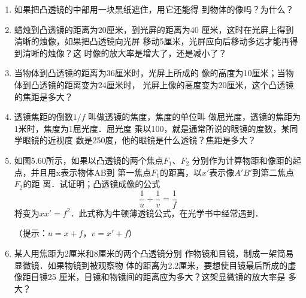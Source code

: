 \begin{enumerate}
\begin{figure}[htp]
	\caption{}
\end{figure}
\item 如果把凸透镜的中部用一块黑纸遮住，用它还能得
到物体的像吗？为什么？
\item 蜡烛到凸透镜的距离为20厘米，到光屏的距离为40
厘米，这时在光屏上得到清晰的烛像，如果把凸透镜向光屏
移动5厘米，光屏应向后移动多远才能再得到清晰的烛像？这
时像的放大率是增大了，还是减小了？
\item 当物体到凸透镜的距离为36厘米时，光屏上所成的
像的高度为10厘米；当物体到凸透镜的距离变为24厘米时，
光屏上像的高度变为20厘米，这个凸透镜的焦距是多大？
\item 透镜焦距的倒数$1/f$
叫做透镜的焦度，焦度的单位叫
做屈光度，透镜的焦距为1米时，焦度为1屈光度．屈光度
乘以100，就是通常所说的眼镜的度数，某同学眼镜的近视度
数是250度，他的眼镜是什么透镜？焦距是多大？
\item 如图5.60所示，如果以凸透镜的两个焦点$F_1$、$F_2$
分别作为计算物距和像距的起点，并且用x表示物体AB到
第一焦点$F_1$的距离，以$x'$表示像$A'B'$到第二焦点$F_2$的距
离．试证明；凸透镜成像的公式
\[\frac{1}{u}+\frac{1}{v}=\frac{1}{f} \]
将变为$xx'=f^2$．此式称为牛顿薄透镜公式，在光学书中经常遇到．
\begin{figure}[htp]
	\centering
{}
	\caption{}
\end{figure}
（提示：$u=x+f$，$v=x'+f$）
\item 某人用焦距为2厘米和8厘米的两个凸透镜分别
作物镜和目镜，制成一架简易显微镜．如果物镜到被观察物
体的距离为2.2厘米，要想使目镜最后所成的虚像距目镜25
厘米，目镜和物镜间的距离应为多大？这架显微镜的放大率是
多大？
\end{enumerate}


